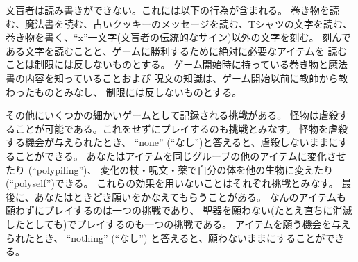 文盲者は読み書きができない。これには以下の行為が含まれる。
巻き物を読む、魔法書を読む、占いクッキーのメッセージを読む、Tシャツの文字を読む、
巻き物を書く、``x''一文字(文盲者の伝統的なサイン)以外の文字を刻む。
刻んである文字を読むことと、ゲームに勝利するために絶対に必要なアイテムを
読むことは制限には反しないものとする。
ゲーム開始時に持っている巻き物と魔法書の内容を知っていることおよび
呪文の知識は、ゲーム開始以前に教師から教わったものとみなし、
制限には反しないものとする。

その他にいくつかの細かいゲームとして記録される挑戦がある。
怪物は虐殺することが可能である。これをせずにプレイするのも挑戦とみなす。
怪物を虐殺する機会が与えられたとき、
``none'' (``なし'')と答えると、虐殺しないままにすることができる。
あなたはアイテムを同じグループの他のアイテムに変化させたり (``polypiling'')、
変化の杖・呪文・薬で自分の体を他の生物に変えたり(``polyself'')できる。
これらの効果を用いないことはそれぞれ挑戦とみなす。
最後に、あなたはときどき願いをかなえてもらうことがある。
なんのアイテムも願わずにプレイするのは一つの挑戦であり、
聖器を願わない(たとえ直ちに消滅したとしても)でプレイするのも一つの挑戦である。
アイテムを願う機会を与えられたとき、
``nothing'' (``なし'') と答えると、願わないままにすることができる。

